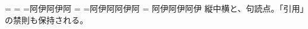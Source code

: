 \documentclass[pdflatex,tate,paper=a5]{jlreq}
\begin{document}
\newbox\tcybox
\setbox\tcybox=\hbox{}%
\ifdim\wd\tcybox=\dimexpr1\jlreq@jareg\relax
  \typeout{TATE-PASS: TCY-GT (wd=\the\wd\tcybox)}%
\else
  \typeout{TATE-FAIL: TCY-GT (wd=\the\wd\tcybox)}%
\fi
\setbox\tcybox=\hbox{}%
\ifdim\wd\tcybox=\dimexpr1\jlreq@jareg\relax
  \typeout{TATE-PASS: TCY-BF (wd=\the\wd\tcybox)}%
\else
  \typeout{TATE-FAIL: TCY-BF (wd=\the\wd\tcybox)}%
\fi
\newdimen\lenwithtcy \newdimen\lenplain
\setbox\tcybox=\hbox{阿伊阿伊阿}%
\lenwithtcy=\wd\tcybox
\setbox\tcybox=\hbox{阿伊阿阿伊阿}%
\lenplain=\wd\tcybox
\ifdim\dimexpr\lenwithtcy-\lenplain\relax<0.5pt\relax
  \ifdim\dimexpr\lenplain-\lenwithtcy\relax<0.5pt\relax
    \typeout{TATE-PASS: TCY-BOUNDARY (delta=\the\dimexpr\lenwithtcy-\lenplain\relax)}%
  \else
    \typeout{TATE-FAIL: TCY-BOUNDARY (delta=\the\dimexpr\lenwithtcy-\lenplain\relax)}%
  \fi
\else
\fi
阿伊阿伊阿伊
縦中横と、句読点。「引用」の禁則も保持される。
\end{document}
